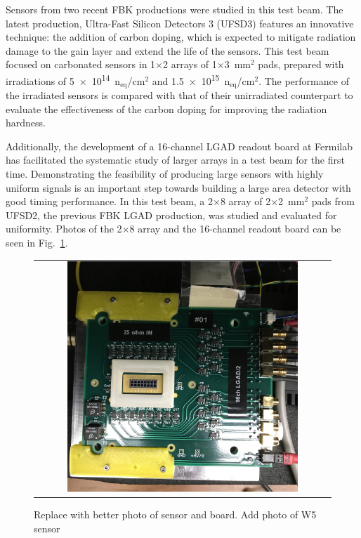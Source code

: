 \documentclass[preprint,1p]{elsarticle}
\begin{document}

Sensors from two recent FBK productions were studied in this test beam. The latest production, Ultra-Fast Silicon Detectors 3 (UFSD3) features an innovative technique: the addition of carbon doping, which is expected to mitigate radiation damage to the gain layer and extend the life of the sensors.
This test beam focused on carbonated sensors in 1$\times$2 arrays of 1$\times$3~mm$^2$ pads, prepared with irradiations of \num{5e14}~n$_{\mathrm{eq}}$/cm$^2$ and \num{1.5e15}~n$_{\mathrm{eq}}$/cm$^2$. The performance of the irradiated sensors is compared with that of their unirradiated counterpart to evaluate the effectiveness of the carbon doping for improving the radiation hardness.

Additionally, the development of a 16-channel LGAD readout board at Fermilab has facilitated the systematic study of larger arrays in a test beam for the first time. Demonstrating the feasibility of producing large sensors with highly uniform signals is an important step towards building a large area detector with good timing performance. In this test beam, a 2$\times$8 array of 2$\times$2~mm$^{2}$ pads from UFSD2, the previous FBK LGAD production, was studied and evaluated for uniformity. Photos of the 2$\times$8 array and the 16-channel readout board can be seen in Fig.~\ref{fig:array_photo}.


\begin{figure}[htp] 
\centering 
\begin{tabular}{c} 
\includegraphics[width=0.8\textwidth]{fig/arrayphoto}   

\end{tabular} 
\caption{Replace with better photo of sensor and board. Add photo of W5 sensor}
\label{fig:array_photo} 
\end{figure} 
\end{document}
